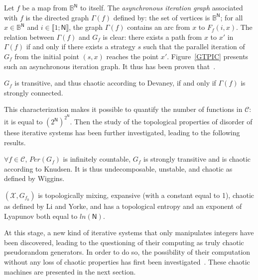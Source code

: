 Let $f$ be a map from $\mathds{B}^\mathsf{N}$ to itself. The
{\emph{asynchronous iteration graph}} associated with $f$ is the
directed graph $\Gamma(f)$ defined by: the set of vertices is
$\mathds{B}^\mathsf{N}$; for all $x\in\mathds{B}^\mathsf{N}$ and 
$i\in \llbracket1;\mathsf{N}\rrbracket$,
the graph $\Gamma(f)$ contains an arc from $x$ to $F_f(i,x)$. 
The relation between $\Gamma(f)$ and $G_f$ is clear: there exists a
path from $x$ to $x'$ in $\Gamma(f)$ if and only if there exists a
strategy $s$ such that the parallel iteration of $G_f$ from the
initial point $(s,x)$ reaches the point $x'$. Figure~\ref{GTPIC} presents
such an asynchronous iteration graph.
It thus has been proven that~\cite{bcgr11:ip}.


\begin{theorem} 
$G_f$  is transitive, and thus chaotic according to Devaney, 
if  and only if $\Gamma(f)$ is strongly connected.
\end{theorem}

This characterization makes it possible to quantify the number of 
functions in $\mathcal{C}$: it is equal to
 $\left(2^\mathsf{N}\right)^{2^\mathsf{N}}$.
Then the study of the topological properties of disorder of these
iterative systems has been further investigated, leading to the following
results.

\begin{theorem}
 $\forall f \in \mathcal{C}$, $Per\left(G_f\right)$ is infinitely countable, $G_f$ is strongly transitive and is chaotic according to Knudsen. It is thus undecomposable, unstable, and chaotic as defined by Wiggins.
 \end{theorem}

 \begin{theorem}
$\left(\mathcal{X}, G_{f_0}\right)$ is topologically mixing, 
     expansive (with a constant equal to 1), chaotic as defined by 
     Li and Yorke, and has a topological entropy and an exponent of Lyapunov 
     both equal to $ln(\mathsf{N})$.
\end{theorem}

At this stage, a new kind of iterative systems that only manipulates 
integers have been discovered, leading to the questioning of their 
computing as truly chaotic pseudorandom generators. In order to do so, the possibility
of their computation without any loss of chaotic properties has first 
been investigated~\cite{GuyeuxThese10}. These chaotic machines are presented in the next
section.



